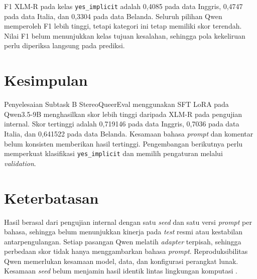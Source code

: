 \documentclass[11pt]{article}
\begin{document}
F1 XLM-R pada kelas \texttt{yes\_implicit} adalah 0,4085 pada data Inggris, 0,4747 pada data Italia, dan 0,3304 pada data Belanda. Seluruh pilihan Qwen memperoleh F1 lebih tinggi, tetapi kategori ini tetap memiliki skor terendah. Nilai F1 belum menunjukkan kelas tujuan kesalahan, sehingga pola kekeliruan perlu diperiksa langsung pada prediksi.

\section{Kesimpulan}
Penyelesaian Subtask B StereoQueerEval menggunakan SFT LoRA pada Qwen3.5-9B menghasilkan skor lebih tinggi daripada XLM-R pada pengujian internal. Skor tertinggi adalah 0,719146 pada data Inggris, 0,7036 pada data Italia, dan 0,641522 pada data Belanda. Kesamaan bahasa \textit{prompt} dan komentar belum konsisten memberikan hasil tertinggi. Pengembangan berikutnya perlu memperkuat klasifikasi \texttt{yes\_implicit} dan memilih pengaturan melalui \textit{validation}.

\section*{Keterbatasan}
Hasil berasal dari pengujian internal dengan satu \textit{seed} dan satu versi \textit{prompt} per bahasa, sehingga belum menunjukkan kinerja pada \textit{test} resmi atau kestabilan antarpengulangan. Setiap pasangan Qwen melatih \textit{adapter} terpisah, sehingga perbedaan skor tidak hanya menggambarkan bahasa \textit{prompt}. Reproduksibilitas Qwen memerlukan kesamaan model, data, dan konfigurasi perangkat lunak. Kesamaan \textit{seed} belum menjamin hasil identik lintas lingkungan komputasi \citep{pytorch-reproducibility}.

\clearpage

\end{document}
